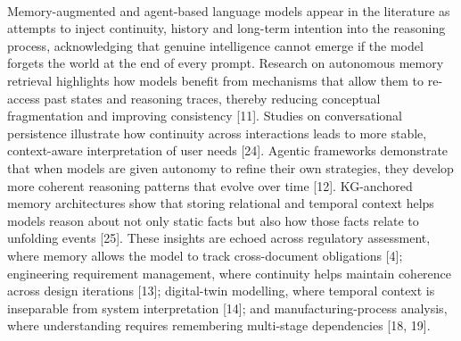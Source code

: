        \paragraph{} 
        Memory-augmented and agent-based language models appear in the literature as attempts to inject continuity, history and long-term intention into the reasoning process, acknowledging that genuine intelligence cannot emerge if the model forgets the world at the end of every prompt. Research on autonomous memory retrieval highlights how models benefit from mechanisms that allow them to re-access past states and reasoning traces, thereby reducing conceptual fragmentation and improving consistency [11]. Studies on conversational persistence illustrate how continuity across interactions leads to more stable, context-aware interpretation of user needs [24]. Agentic frameworks demonstrate that when models are given autonomy to refine their own strategies, they develop more coherent reasoning patterns that evolve over time [12]. KG-anchored memory architectures show that storing relational and temporal context helps models reason about not only static facts but also how those facts relate to unfolding events [25]. These insights are echoed across regulatory assessment, where memory allows the model to track cross-document obligations [4]; engineering requirement management, where continuity helps maintain coherence across design iterations [13]; digital-twin modelling, where temporal context is inseparable from system interpretation [14]; and manufacturing-process analysis, where understanding requires remembering multi-stage dependencies [18, 19]. 

